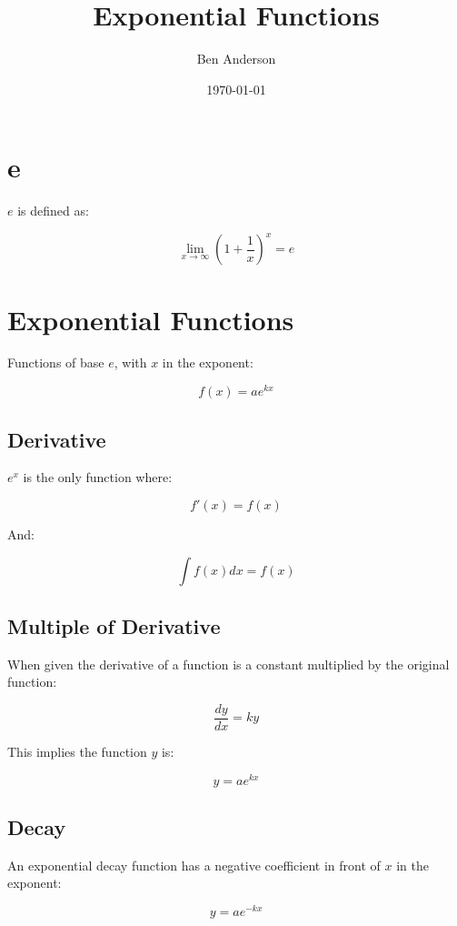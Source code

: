 \documentclass[a4paper,11pt]{article}
\begin{document}
\title{Exponential Functions}
\author{Ben Anderson}
\date{\today}
\maketitle
\pagebreak

\tableofcontents
\pagebreak


\section{e}

$e$ is defined as:

$$
\lim_{x \to \infty} (1 + \frac{1}{x})^x = e
$$




\section{Exponential Functions}

Functions of base $e$, with $x$ in the exponent:

$$
f(x) = ae^{kx}
$$


\subsection{Derivative}

$e^x$ is the only function where:

$$
f'(x) = f(x)
$$

And:

$$
\int f(x) dx = f(x)
$$


\subsection{Multiple of Derivative}

When given the derivative of a function is a constant multiplied by the
original function:

$$
\frac{dy}{dx} = ky
$$

This implies the function $y$ is:

$$
y = ae^{kx}
$$


\subsection{Decay}

An exponential decay function has a negative coefficient in front of $x$ in the
exponent:

$$
y = ae^{-kx}
$$
\end{document}
